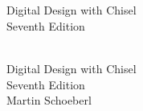 \documentclass[%
    10pt,
    headinclude, footexclude,
    openright, %
    notitlepage,
    cleardoubleempty,
    headsepline,
    pointlessnumbers,
    bibtotoc, idxtotoc,
    ]{scrbook}
\newif\ifbook
\begin{document}
\ifbook
\else

\newpage
\thispagestyle{empty}
~
\newpage
\fi



\begin{flushleft}
\pagestyle{empty}
\ \\
\vspace{1cm}
{\mdseries\huge Digital Design with Chisel}
\ \\
\vspace{1cm}
{\mdseries\Large Seventh Edition}
\cleardoublepage
\end{flushleft}
\newpage


\begin{flushleft}
\pagestyle{empty}
\ \\
\vspace{1cm}
{\Huge Digital Design with Chisel\\
\bigskip
{\huge Seventh Edition}\\
\bigskip
\bigskip
\bigskip
\bigskip
\bigskip
{\huge Martin Schoeberl}
\medskip\\

}

\newpage
\end{flushleft}
\end{document}

